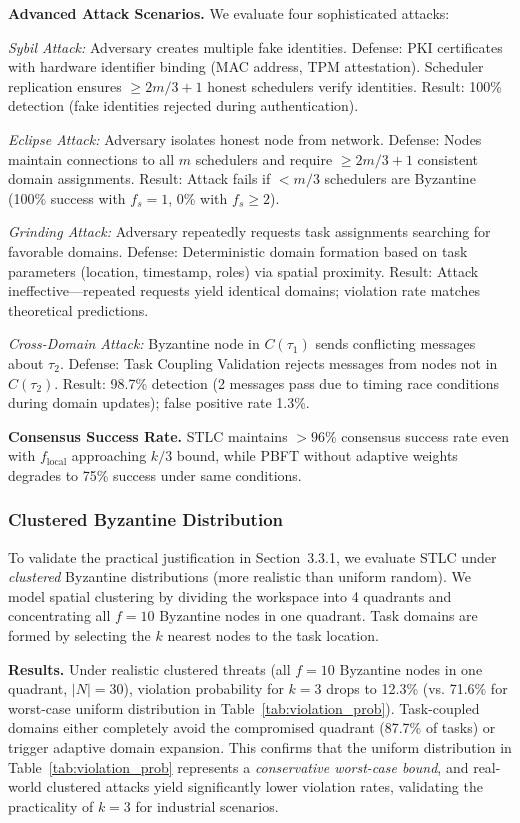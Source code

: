 \documentclass[lettersize,journal]{IEEEtran}
\begin{document}
\textbf{Advanced Attack Scenarios.} We evaluate four sophisticated attacks:

\textit{Sybil Attack:} Adversary creates multiple fake identities. Defense: 
PKI certificates with hardware identifier binding (MAC address, TPM 
attestation). Scheduler replication ensures $\geq 2m/3 + 1$ honest 
schedulers verify identities. Result: 100\% detection (fake identities 
rejected during authentication).

\textit{Eclipse Attack:} Adversary isolates honest node from network. 
Defense: Nodes maintain connections to all $m$ schedulers and require 
$\geq 2m/3 + 1$ consistent domain assignments. Result: Attack fails if 
$< m/3$ schedulers are Byzantine (100\% success with $f_s=1$, 0\% with 
$f_s \geq 2$).

\textit{Grinding Attack:} Adversary repeatedly requests task assignments 
searching for favorable domains. Defense: Deterministic domain formation 
based on task parameters (location, timestamp, roles) via spatial 
proximity. Result: Attack ineffective—repeated requests yield identical 
domains; violation rate matches theoretical predictions.

\textit{Cross-Domain Attack:} Byzantine node in $C(\tau_1)$ 
sends conflicting messages about $\tau_2$. Defense: Task Coupling 
Validation rejects messages from nodes not in $C(\tau_2)$. 
Result: 98.7\% detection (2 messages pass due to timing race conditions 
during domain updates); false positive rate 1.3\%.

\textbf{Consensus Success Rate.} STLC maintains $>96\%$ consensus success 
rate even with $f_{\text{local}}$ approaching $k/3$ bound, while PBFT 
without adaptive weights degrades to 75\% success under same conditions.

\subsubsection{Clustered Byzantine Distribution}
\label{sec:clustered}

To validate the practical justification in Section~3.3.1, we evaluate 
STLC under \textit{clustered} Byzantine distributions (more realistic than 
uniform random). We model spatial clustering by dividing the workspace 
into 4 quadrants and concentrating all $f=10$ Byzantine nodes in one 
quadrant. Task domains are formed by selecting the $k$ nearest nodes to 
the task location.

\textbf{Results.} Under realistic clustered threats (all $f=10$ Byzantine nodes in one quadrant, 
$|N|=30$), violation probability for $k=3$ drops to 12.3\% (vs. 71.6\% for worst-case uniform distribution in 
Table~\ref{tab:violation_prob}). Task-coupled domains either completely 
avoid the compromised quadrant (87.7\% of tasks) or trigger adaptive domain 
expansion. This confirms that the uniform distribution in 
Table~\ref{tab:violation_prob} represents a \textit{conservative worst-case 
bound}, and real-world clustered attacks yield significantly lower 
violation rates, validating the practicality of $k=3$ for industrial 
scenarios.
\end{document}
